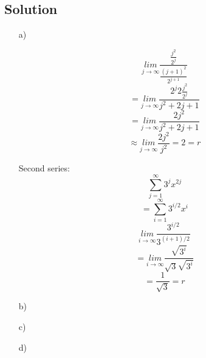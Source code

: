 \documentclass[10pt]{article}
\numberwithin{equation}{section}
\begin{document}
\subsection*{Solution}
\begin{enumerate}
  \item[a)]{
       $$\underset{j\rightarrow \infty}{lim} \frac{\frac{j^2}{2^j}}{\frac{(j+1)^2}{2^{j+1}}}$$
       $$=\underset{j\rightarrow \infty}{lim} \frac{2^j 2 \frac{j^2}{2^j}}{j^2 + 2j + 1}$$
       $$=\underset{j\rightarrow \infty}{lim} \frac{2 j^2}{j^2 + 2j + 1}$$
       $$\approx \underset{j\rightarrow \infty}{lim} \frac{2 j^2}{j^2} = 2 = r$$

       Second series:
       $$\sum_{j=1}^{\infty} 3^j x^{2j}$$
       $$=\sum_{i=1}^{\infty} 3^{i/2} x^i$$
       $$\underset{i\rightarrow \infty}{lim} \frac{3^{i/2}}{3^{(i+1)/2}}$$
       $$=\underset{i\rightarrow \infty}{lim} \frac{\sqrt{3^i}}{\sqrt{3}\sqrt{3^i}}$$
       $$=\frac{1}{\sqrt{3}} = r$$
    }
  \item[b)]{
    }
  \item[c)]{
    }
  \item[d)]{
    }
\end{enumerate}
\end{document}

